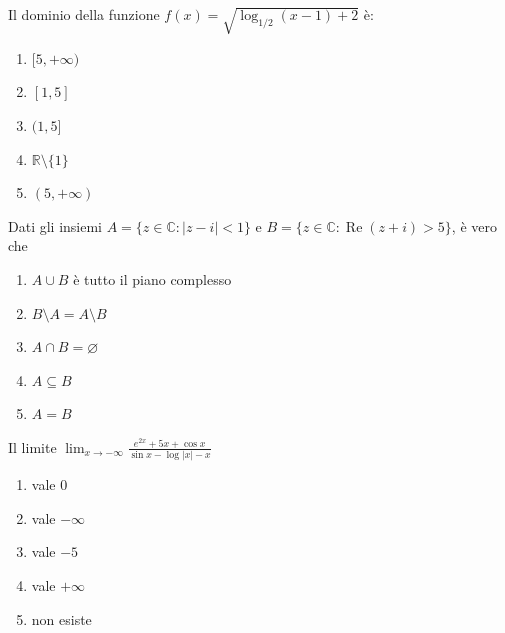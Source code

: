 \begin{quiz}
Il dominio della funzione $f(x)=\sqrt{\log_{1/2}(x-1)+2}$ \`e:
\begin{enumerate}
\item $[5,+\infty)$
\item $[1,5]$
\item $(1,5]$
\item $\mathbb R\setminus\{1\}$
\item $(5,+\infty)$
\end{enumerate}
\end{quiz}

\begin{quiz}
Dati gli insiemi $A=\{z\in\mathbb C:|z-i|<1\}$ e $B=\{z\in\mathbb C:\operatorname{Re}(z+i)>5\}$, \`e vero che
\begin{enumerate}
\item $A\cup B$ \`e tutto il piano complesso
\item $B\setminus A=A\setminus B$
\item $A\cap B=\varnothing$
\item $A\subseteq B$
\item $A=B$
\end{enumerate}
\end{quiz}

\begin{quiz}
Il limite $\displaystyle\lim_{x\to-\infty}\frac{e^{2x}+5x+\cos x}{\sin x-\log|x|-x}$
\begin{enumerate}
\item vale $0$
\item vale $-\infty$
\item vale $-5$
\item vale $+\infty$
\item non esiste
\end{enumerate}
\end{quiz}

